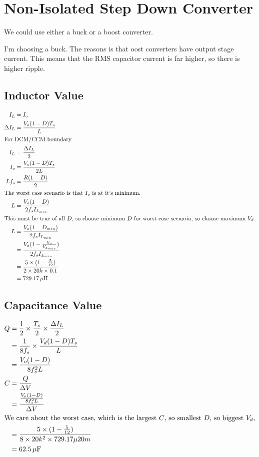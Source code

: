 \section{Non-Isolated Step Down Converter}

We could use either a buck or a boost converter.

I'm choosing a buck. The reasons is that oost converters have output stage current. This means that the RMS capacitor current is far higher, so there is higher ripple.
 
\subsection*{Inductor Value}

\begin{align*}
I_L & = I_o \\
\Delta I_L & = \frac{V_o (1-D)T_s}{L} \\
\intertext{For DCM/CCM boundary}
I_L & = \frac{\Delta I_L}{2} \\
I_o & = \frac{V_o (1-D)T_s}{2L} \\
Lf_s & = \frac{R(1-D)}{2} \\
\intertext{The worst case scenario is that $I_o$ is at it's minimum.}
L & = \frac{V_o (1-D)}{2f_sI_{L_{min}}} \\
\intertext{This must be true of all $D$, so choose minimum $D$ for worst case scenario, so choose maximum $V_d$.}
L & = \frac{V_o (1-D_{min})}{2f_sI_{L_{min}}} \\
  & = \frac{V_o (1-\frac{V_o}{V_{d_{max}}})}{2f_sI_{L_{min}}} \\
  & = \frac{5 \times (1-\frac{5}{12})}{2\times 20k \times 0.1} \\
  & = \unit[729.17]{\mu{} H}
\end{align*}

\subsection*{Capacitance Value}

\begin{align*}
Q & = \frac{1}{2} \times \frac{T_s}{2} \times \frac{\Delta I_L}{2} \\
  & = \frac{1}{8f_s} \times \frac{V_d (1-D) T_s}{L} \\
  & = \frac{V_o (1-D)}{8f_s^2 L} \\
C & = \frac{Q}{\Delta V} \\
  & = \frac{\frac{V_o (1-D)}{8f_s^2 L}}{\Delta V} \\
\intertext{We care about the worst case, which is the largest $C$, so smallest $D$, so biggest $V_d$,}
  & = \frac{5 \times (1-\frac{5}{12})}{8 \times 20k^2 \times 729.17\mu 20m} \\
  & = \unit[62.5]{\mu F}
\end{align*}

